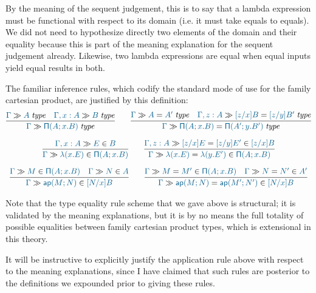 By the meaning of the sequent judgement, this is to say that a lambda
expression must be functional with respect to its domain (i.e. it must take
equals to equals). We did not need to hypothesize directly two elements of the
domain and their equality because this is part of the meaning explanation for
the sequent judgement already. Likewise, two lambda expressions are equal when
equal inputs yield equal results in both.

The familiar inference rules, which codify the standard mode of use for the
family cartesian product, are justified by this definition:
\begin{gather*}
  \infer{
    \sequent\Gamma\isset{\typrod{A}{x}{B}}
  }{
    \sequent\Gamma\isset{A} &
    \sequent{\Gamma,x:A}{\isset{B}}
  }\qquad
  \infer{
    \sequent\Gamma\eisset{\typrod{A}{x}{B}}{\typrod{A'}{y}{B'}}
  }{
    \sequent\Gamma\eisset{A}{A'} &
    \sequent{\Gamma,z:A}{\eisset{[z/x]B}{[z/y]B'}}
  }\\[6pt]
  \infer{
    \sequent\Gamma\ver{\lam{x}{E}}{\typrod{A}{x}{B}}
  }{
    \sequent{\Gamma,x:A}{\ver{E}{B}}
  }\qquad
  \infer{
    \sequent\Gamma\ever{\lam{x}{E}}{\lam{y}{E'}}{\typrod{A}{x}{B}}
  }{
    \sequent{\Gamma,z:A}{\ever{[z/x]E}{[z/y]E'}{[z/x]B}}
  }\\[6pt]
  \infer{
    \sequent\Gamma\ver{\ap{M}{N}}{[N/x]B}
  }{
    \sequent\Gamma\ver{M}{\typrod{A}{x}{B}} &
    \sequent\Gamma\ver{N}{A}
  }\qquad
  \infer{
    \sequent\Gamma\ever{\ap{M}{N}}{\ap{M'}{N'}}{[N/x]B}
  }{
    \sequent\Gamma\ever{M}{M'}{\typrod{A}{x}{B}} &
    \sequent\Gamma\ever{N}{N'}{A'}
  }
\end{gather*}

Note that the type equality rule scheme that we gave above is structural; it is
validated by the meaning explanations, but it is by no means the full totality
of possible equalities between family cartesian product types, which is
extensional in this theory.

It will be instructive to explicitly justify the application rule above with
respect to the meaning explanations, since I have claimed that such rules are
posterior to the definitions we expounded prior to giving these rules.

